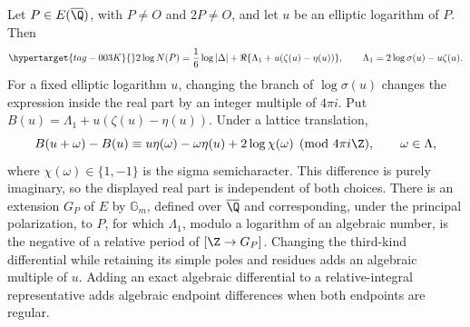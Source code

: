 \begin{proposition}\hypertarget{tag-0017}{}\label{ari:C.7.1}\hypertarget{tag-IA01}{}\label{ari:C.7.1:lift-transport}

Let $P\in E(\overline\Q)$, with $P\ne O$ and $2P\ne O$, and
let $u$ be an elliptic logarithm of $P$. Then
\begin{equation}\hypertarget{tag-003K}{}\label{ari:eq:cp-sigma}
 2\log N(P)=\frac16\log|\Delta|
       +\Re\{\Lambda_1+u(\zeta(u)-\eta(u))\},
 \qquad \Lambda_1=2\log\sigma(u)-u\zeta(u).
\end{equation}
For a fixed elliptic logarithm $u$, changing the branch of
$\log\sigma(u)$ changes the expression inside the real part by an
integer multiple of $4\pi i$. Put
$B(u)=\Lambda_1+u(\zeta(u)-\eta(u))$. Under a lattice translation,
\[
 B(u+\omega)-B(u)\equiv
 u\eta(\omega)-\omega\eta(u)+2\log\chi(\omega)
 \pmod{4\pi i\Z},\qquad \omega\in\Lambda,
\]
where $\chi(\omega)\in\{1,-1\}$ is the sigma semicharacter.
This difference is purely imaginary, so the displayed real part
is independent of both choices.
There is an extension $G_P$ of $E$ by $\mathbb G_m$, defined
over $\overline\Q$ and corresponding, under the principal
polarization, to $P$, for which $\Lambda_1$, modulo a logarithm
of an algebraic number, is the negative of a relative period
of $[\Z\to G_P]$. Changing the third-kind differential while retaining its simple
poles and residues adds an algebraic multiple of $u$.
Adding an exact algebraic differential to a relative-integral
representative adds algebraic endpoint differences when both
endpoints are regular.
\end{proposition}


